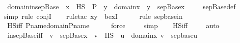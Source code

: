 \begin{isabellebody}
%
\endisadelimproof
\isanewline
{}\isamarkupfalse%
\ domain{\isacharunderscore}{\kern0pt}in{\isacharunderscore}{\kern0pt}sep{\isacharunderscore}{\kern0pt}Base\ {\isacharcolon}{\kern0pt}\ {\isachardoublequoteopen}x\ {\isasymsubseteq}\ HS\ {\isasymtimes}\ P\ {\isasymLongrightarrow}\ y\ {\isasymin}\ domain{\isacharparenleft}{\kern0pt}x{\isacharparenright}{\kern0pt}\ {\isasymLongrightarrow}\ y\ {\isasymin}\ sep{\isacharunderscore}{\kern0pt}Base{\isacharparenleft}{\kern0pt}x{\isacharparenright}{\kern0pt}{\isachardoublequoteclose}\ \isanewline
%
\isadelimproof
\ \ %
\endisadelimproof
%
\isatagproof
{}\isamarkupfalse%
\ sep{\isacharunderscore}{\kern0pt}Base{\isacharunderscore}{\kern0pt}def\ \isanewline
\ \ \isamarkupfalse%
{\isacharparenleft}{\kern0pt}simp{\isacharcomma}{\kern0pt}\ rule\ conjI{\isacharparenright}{\kern0pt}\isanewline
\ \ \ \isamarkupfalse%
{\isacharparenleft}{\kern0pt}rule{\isacharunderscore}{\kern0pt}tac\ x{\isacharequal}{\kern0pt}{\isachardoublequoteopen}y{\isachardoublequoteclose}\ \ bexI{\isacharparenright}{\kern0pt}\ \isanewline
\ \ \ \ \isamarkupfalse%
{\isacharparenleft}{\kern0pt}rule\ sep{\isacharunderscore}{\kern0pt}base{\isacharunderscore}{\kern0pt}in{\isacharparenright}{\kern0pt}\isanewline
\ \ \isamarkupfalse%
\ HS{\isacharunderscore}{\kern0pt}iff\ P{\isacharunderscore}{\kern0pt}name{\isacharunderscore}{\kern0pt}domain{\isacharunderscore}{\kern0pt}P{\isacharunderscore}{\kern0pt}name\isanewline
\ \ \ \ \isamarkupfalse%
\ force\isanewline
\ \ \ \isamarkupfalse%
\ simp\isanewline
\ \ \isamarkupfalse%
\ HS{\isacharunderscore}{\kern0pt}iff\ \isanewline
\ \ \isamarkupfalse%
\ auto%
\endisatagproof
{\isafoldproof}%
%
\isadelimproof
\isanewline
%
\endisadelimproof
\isanewline
{}\isamarkupfalse%
\ in{\isacharunderscore}{\kern0pt}sep{\isacharunderscore}{\kern0pt}Base{\isacharunderscore}{\kern0pt}iff\ {\isacharcolon}{\kern0pt}\ {\isachardoublequoteopen}v\ {\isasymin}\ sep{\isacharunderscore}{\kern0pt}Base{\isacharparenleft}{\kern0pt}x{\isacharparenright}{\kern0pt}\ {\isasymlongleftrightarrow}\ {\isacharparenleft}{\kern0pt}v\ {\isasymin}\ HS\ {\isasymand}\ {\isacharparenleft}{\kern0pt}{\isasymexists}u\ {\isasymin}\ domain{\isacharparenleft}{\kern0pt}x{\isacharparenright}{\kern0pt}{\isachardot}{\kern0pt}\ v\ {\isasymin}\ sep{\isacharunderscore}{\kern0pt}base{\isacharparenleft}{\kern0pt}u{\isacharparenright}{\kern0pt}{\isacharparenright}{\kern0pt}{\isacharparenright}{\kern0pt}{\isachardoublequoteclose}\ \isanewline

\end{isabellebody}
